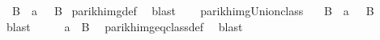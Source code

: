 \begin{isabellebody}
\ {\isachardoublequoteopen}{\isasymPsi}\ {\isacharparenleft}{\kern0pt}{\isacharquery}{\kern0pt}B{\isacharprime}{\kern0pt}\ {\isasymunion}\ {\isacharbraceleft}{\kern0pt}a{\isacharbraceright}{\kern0pt}{\isacharparenright}{\kern0pt}\ {\isacharequal}{\kern0pt}\ {\isasymPsi}\ {\isacharquery}{\kern0pt}B{\isacharprime}{\kern0pt}{\isachardoublequoteclose}\isamarkupfalse%
\ parikh{\isacharunderscore}{\kern0pt}img{\isacharunderscore}{\kern0pt}def\ \isamarkupfalse%
\ blast\isanewline
\ \ \isamarkupfalse%
\ parikh{\isacharunderscore}{\kern0pt}img{\isacharunderscore}{\kern0pt}Union{\isacharunderscore}{\kern0pt}class\ \isamarkupfalse%
\ {\isachardoublequoteopen}{\isasymPsi}\ {\isacharparenleft}{\kern0pt}{\isacharquery}{\kern0pt}B{\isacharprime}{\kern0pt}\ {\isasymunion}\ {\isacharbraceleft}{\kern0pt}a{\isacharbraceright}{\kern0pt}{\isacharparenright}{\kern0pt}\ {\isacharequal}{\kern0pt}\ {\isasymPsi}\ B{\isachardoublequoteclose}\ \isamarkupfalse%
\ blast\isanewline
\ \ \isamarkupfalse%
\ \isamarkupfalse%
\ {\isachardoublequoteopen}a\ {\isasymin}\ {\isacharquery}{\kern0pt}B{\isacharprime}{\kern0pt}{\isachardoublequoteclose}\ \isamarkupfalse%
\ parikh{\isacharunderscore}{\kern0pt}img{\isacharunderscore}{\kern0pt}eq{\isacharunderscore}{\kern0pt}class{\isacharunderscore}{\kern0pt}def\ \isamarkupfalse%
\ blast\isanewline
{}\isamarkupfalse%
%
\endisatagproof
{\isafoldproof}%
%
\isadelimproof
\isanewline
%
\endisadelimproof
%
\isadelimtheory
\isanewline
%
\endisadelimtheory
%
\isatagtheory
{}\isamarkupfalse%
%
\endisatagtheory
{\isafoldtheory}%
%
\isadelimtheory
%
\endisadelimtheory
%
\end{isabellebody}%
\endinput
